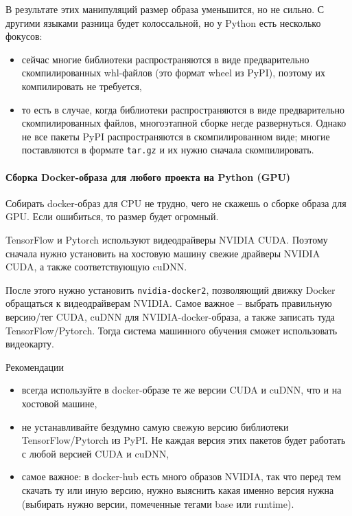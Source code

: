 \documentclass[%
	11pt,
	a4paper,
	utf8,
		]{article}
\begin{document}
В результате этих манипуляций размер образа уменьшится, но не сильно. С другими языками разница будет колоссальной, но у Python есть несколько фокусов:
\begin{itemize}
	\item сейчас многие библиотеки распространяются в виде предварительно скомпилированных whl-файлов (это формат wheel из PyPI), поэтому их компилировать не требуется,
	
	\item то есть в случае, когда библиотеки распространяются в виде предварительно скомпилированных файлов, многоэтапной сборке негде развернуться. Однако не все пакеты PyPI распространяются в скомпилированном виде; многие поставляются в формате \texttt{tar.gz} и их нужно сначала скомпилировать.
\end{itemize}

\paragraph{Сборка Docker-образа для любого проекта на Python (GPU)} Собирать docker-образ для CPU не трудно, чего не скажешь о сборке образа для GPU. Если ошибиться, то размер будет огромный.

TensorFlow и Pytorch используют видеодрайверы NVIDIA CUDA. Поэтому сначала нужно установить на хостовую машину свежие драйверы NVIDIA CUDA, а также соответствующую cuDNN.

После этого нужно установить \texttt{nvidia-docker2}, позволяющий движку Docker обращаться к видеодрайверам NVIDIA. Самое важное -- выбрать правильную версию/тег CUDA, cuDNN для NVIDIA-docker-образа, а также записать туда TensorFlow/Pytorch. Тогда система машинного обучения сможет использовать видеокарту.

Рекомендации
\begin{itemize}
	\item всегда используйте в docker-образе те же версии CUDA и cuDNN, что и на хостовой машине,
	
	\item не устанавливайте бездумно самую свежую версию библиотеки TensorFlow/Pytorch из PyPI. Не каждая версия этих пакетов будет работать с любой версией CUDA и cuDNN,
	
	\item самое важное: в docker-hub есть много образов NVIDIA, так что перед тем скачать ту или иную версию, нужно выяснить какая именно версия нужна (выбирать нужно версии, помеченные тегами base или runtime).
\end{itemize}
\end{document}
